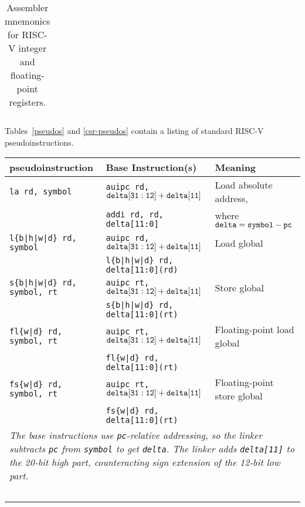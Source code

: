 \begin{table*}[htbp]
\begin{center}
\begin{tabular}{|l|l|l|l|}
 \end{tabular}
\end{center}
\caption{Assembler mnemonics for RISC-V integer and floating-point registers.}
\label{regmap}
\end{table*}

Tables~\ref{pseudos} and \ref{csr-pseudos} contain a listing of standard
RISC-V pseudoinstructions.

\begin{table}[h]
\begin{small}
\begin{center}
\begin{tabular}{l l l}
pseudoinstruction & Base Instruction(s) & Meaning \\ \hline

\tt la rd, symbol & {\tt auipc rd, ${\tt delta[31:12]} + {\tt delta[11]}$} & Load absolute address, \\
                  & {\tt addi rd, rd, delta[11:0]}                         & where ${\tt delta} = {\tt symbol} - {\tt pc}$ \\[1ex]
\tt l\{b|h|w|d\} rd, symbol & {\tt auipc rd, ${\tt delta[31:12]} + {\tt delta[11]}$} & Load global \\
                            & {\tt l\{b|h|w|d\} rd, delta[11:0](rd)}                 & \\[1ex]
\tt s\{b|h|w|d\} rd, symbol, rt & {\tt auipc rt, ${\tt delta[31:12]} + {\tt delta[11]}$} & Store global \\
                               & {\tt s\{b|h|w|d\} rd, delta[11:0](rt)}                 & \\[1ex]
\tt fl\{w|d\} rd, symbol, rt & {\tt auipc rt, ${\tt delta[31:12]} + {\tt delta[11]}$} & Floating-point load global \\
                             & {\tt fl\{w|d\} rd, delta[11:0](rt)}                    & \\[1ex]
\tt fs\{w|d\} rd, symbol, rt & {\tt auipc rt, ${\tt delta[31:12]} + {\tt delta[11]}$} & Floating-point store global \\
                             & {\tt fs\{w|d\} rd, delta[11:0](rt)}                    & \\[1ex]
\multicolumn{3}{p{.99\textwidth}}{\small \em The base instructions use {\tt pc}-relative addressing, so the linker subtracts {\tt pc} from {\tt symbol} to get {\tt delta}.  The linker adds {\tt delta[11]} to the 20-bit high part, counteracting sign extension of the 12-bit low part.} \\
~\\

\end{tabular}
\end{center}
\end{small}
\end{table}
